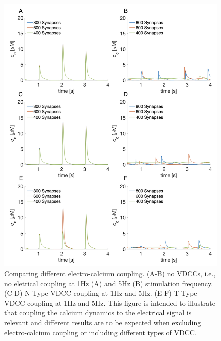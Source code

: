 \documentclass[review,supplement,onefignum,onetabnum]{siamart190516}
\begin{document}
\begin{figure}[!h]\label{fig:VDCCFig}
    \centering
    \includegraphics[width=12cm]{Figures/VDCCFig.png}
    \caption{Comparing different electro-calcium coupling. (A-B) no VDCCs, i.e., no eletrical coupling at 1Hz (A) and 5Hz (B) stimulation frequency. (C-D) N-Type VDCC coupling at 1Hz and 5Hz. (E-F) T-Type VDCC coupling at 1Hz and 5Hz. This figure is intended to illustrate that coupling the calcium dynamics to the electrical signal is relevant and different results are to be expected when excluding electro-calcium coupling or including different types of VDCC.} 
\end{figure}
\end{document}
